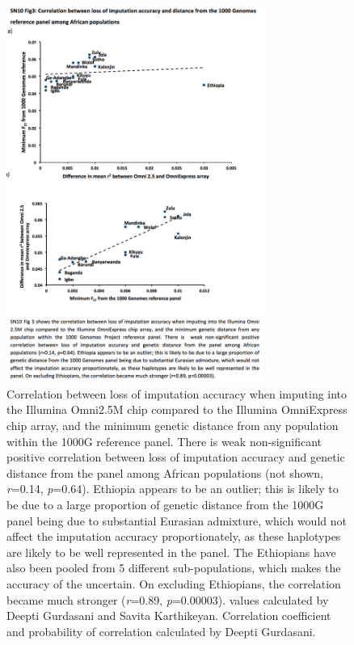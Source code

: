 \begin{figure}
\centering
\includegraphics[trim={0.5cm 6.5cm 0cm 15cm},clip,width=0.75\textwidth]{fig/SN10f3}
\caption[Loss of imputation accuracy upon thinning to an OmniExpress subset of \glspl{SNP} as a function of .]{
    Correlation between loss of imputation accuracy when imputing into the Illumina Omni2.5M chip compared to the Illumina OmniExpress chip array, and the minimum genetic distance from any population within the \gls{1000G} reference panel. There is weak non-significant positive correlation between loss of imputation accuracy and genetic distance from the panel among African populations (not shown, \textit{r}=0.14, \textit{p}=0.64). Ethiopia appears to be an outlier; this is likely to be due to a large proportion of genetic distance from the \gls{1000G} panel being due to substantial Eurasian admixture, which would not affect the imputation accuracy proportionately, as these haplotypes are likely to be well represented in the panel. The Ethiopians have also been pooled from 5 different sub-populations, which makes the accuracy of the  uncertain. On excluding Ethiopians, the correlation became much stronger (\textit{r}=0.89, \textit{p}=0.00003).  values calculated by Deepti Gurdasani and Savita Karthikeyan. Correlation coefficient and probability of correlation calculated by Deepti Gurdasani.}
\label{fig:SN10f3}
\end{figure}